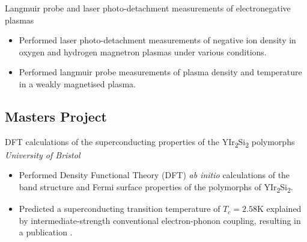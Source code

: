 \documentclass[11pt,a4paper,sans]{moderncv}        %
\begin{document}
{Langmuir probe and laser photo-detachment measurements of electronegative plasmas}
{}
{}
{}
{
\begin{itemize}%
\item Performed laser photo-detachment measurements of negative ion density in oxygen and hydrogen magnetron plasmas under various conditions.
\item Performed langmuir probe measurements of plasma density and temperature in a weakly magnetised plasma.
\end{itemize}
}

\subsection{Masters Project}
{DFT calculations of the superconducting properties of the \texorpdfstring{YIr\textsubscript{2}Si\textsubscript{2}}{YIr2Si2} polymorphs}
{\newline \emph{University of Bristol}}
{}
{}
{\begin{itemize}%
\item Performed Density Functional Theory (DFT) \textit{ab initio} calculations of the band structure and Fermi surface properties of the polymorphs of \texorpdfstring{YIr\textsubscript{2}Si\textsubscript{2}}{YIr2Si2}.
\item Predicted a superconducting transition temperature of $T_c= 2.58$K explained by intermediate-strength conventional electron-phonon coupling, resulting in a publication \cite{Billington2014}.
\end{itemize}}
\end{document}
